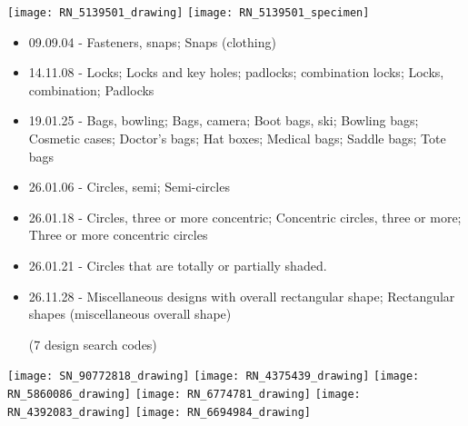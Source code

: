 \documentclass[aspectratio=1610]{beamer}
\begin{document}
\begin{frame}

\begin{minipage}{.5\textwidth}
\texttt{[image: RN\_5139501\_drawing]}
\texttt{[image: RN\_5139501\_specimen]}
\end{minipage}%
\begin{minipage}{.5\textwidth}

\begin{itemize}
\tiny

\item 09.09.04 - Fasteners, snaps; Snaps (clothing)
\item 14.11.08 - Locks; Locks and key holes; padlocks; combination locks; Locks, combination; Padlocks
\item 19.01.25 - Bags, bowling; Bags, camera; Boot bags, ski; Bowling bags; Cosmetic cases; Doctor's bags; Hat boxes; Medical bags; Saddle bags; Tote bags
\item 26.01.06 - Circles, semi; Semi-circles
\item 26.01.18 - Circles, three or more concentric; Concentric circles, three or more; Three or more concentric circles
\item 26.01.21 - Circles that are totally or partially shaded.
\item 26.11.28 - Miscellaneous designs with overall rectangular shape; Rectangular shapes (miscellaneous overall shape)

\medskip

(7 design search codes)

\end{itemize}
\end{minipage}

\end{frame}

\begin{frame}

\centering

\texttt{[image: SN\_90772818\_drawing]}
\texttt{[image: RN\_4375439\_drawing]}
\texttt{[image: RN\_5860086\_drawing]}
\texttt{[image: RN\_6774781\_drawing]}
\texttt{[image: RN\_4392083\_drawing]}
\texttt{[image: RN\_6694984\_drawing]}

\end{frame}
\end{document}
